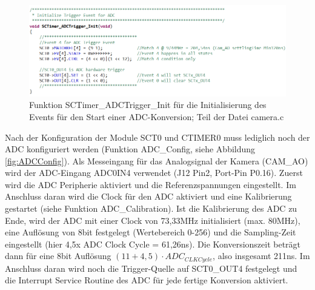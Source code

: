 \begin{figure}[H] %
\includegraphics[width=.95\textwidth]{sec7/images/code/SCTimerADCTriggerInit} 
\centering
\captionsetup{width=.95\textwidth}
\caption[Funktion \glqq{}SCTimer\_ADCTrigger\_Init\grqq{} aus der Datei \glqq{}camera.c\grqq{}]{Funktion \glqq{}SCTimer\_ADCTrigger\_Init\grqq{} für die Initialisierung des Events für den Start einer ADC-Konversion; Teil der Datei \glqq{}camera.c\grqq{}}\centering
\label{fig:SCTimerADCTriggerInit}
\end{figure}

Nach der Konfiguration der Module SCT0 und CTIMER0 muss lediglich noch der ADC konfiguriert werden (Funktion \glqq{}ADC\_Config\grqq{}, siehe Abbildung \ref{fig:ADCConfig}). Als Messeingang für das Analogsignal der Kamera (CAM\_AO) wird der ADC-Eingang ADC0IN4 verwendet (J12 Pin2, Port-Pin P0.16). Zuerst wird die ADC Peripherie aktiviert und die Referenzspannungen eingestellt. Im Anschluss daran wird die Clock für den ADC aktiviert und eine Kalibrierung gestartet (siehe Funktion \glqq{}ADC\_Calibration\grqq{}). Ist die Kalibrierung des ADC zu Ende, wird der ADC mit einer Clock von 73,33MHz initialisiert (max. 80MHz), eine Auflösung von 8bit festgelegt (Wertebereich 0-256) und die Sampling-Zeit eingestellt (hier 4,5x ADC Clock Cycle = 61,26ns). Die Konversionszeit beträgt dann für eine 8bit Auflösung $(11 + 4,5) \cdot ADC_{CLKCycle}$, also insgesamt 211ns. Im Anschluss daran wird noch die Trigger-Quelle auf SCT0\_OUT4 festgelegt und die Interrupt Service Routine des ADC für jede fertige Konversion aktiviert.

